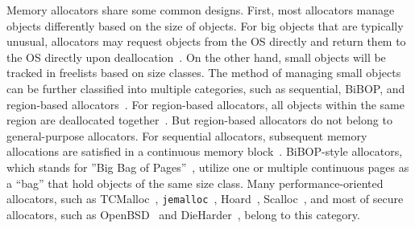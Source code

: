 Memory allocators share some common designs. First, most allocators manage objects differently based on the size of objects. For big objects that are typically unusual, allocators may request objects from the OS directly and return them to the OS directly upon deallocation~\citep{Hoard}. On the other hand, small objects will be tracked in freelists based on size classes. The method of managing small objects can be further classified into multiple categories, such as sequential, BiBOP, and region-based allocators~\citep{DieHarder, Gay:1998:MME:277650.277748}. For region-based allocators, all objects within the same region are deallocated together~\citep{Gay:1998:MME:277650.277748}.  But region-based allocators do not belong to general-purpose allocators. For sequential allocators, subsequent memory allocations are satisfied in a continuous memory block~\citep{Cling}. BiBOP-style allocators, which stands for ''Big Bag of Pages''~\citep{hanson1980portable}, utilize one or multiple continuous pages as a ``bag'' that hold objects of the same size class. Many performance-oriented allocators, such as TCMalloc~\citep{tcmalloc}, \texttt{jemalloc}~\citep{jemalloc}, Hoard~\citep{Hoard}, Scalloc~\citep{Scalloc}, and most of secure allocators, such as OpenBSD~\citep{openbsd} and DieHarder~\citep{DieHarder}, belong to this category. 

 

 